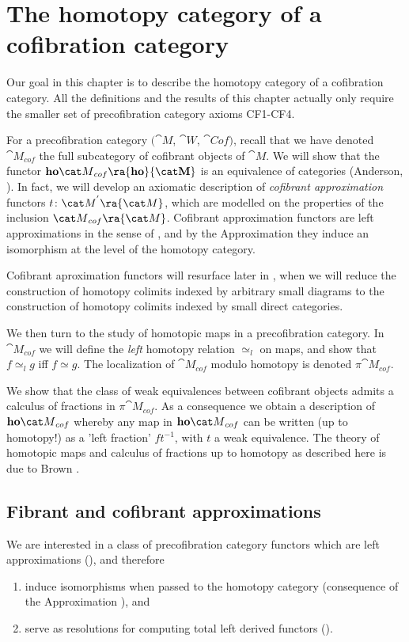 \chapter{The homotopy category of a cofibration category}
\label{chap:homotcat}

Our goal in this chapter is to describe the homotopy category of a cofibration category. All the definitions and the results of this chapter actually only require the smaller set of precofibration category axioms CF1-CF4. 

For a precofibration category $({\cat M}$, ${\cat W}$, ${\cat Cof})$, recall that we have denoted ${\cat M}_{cof}$ the full subcategory of cofibrant objects of ${\cat M}$. We will show that the functor ${\bf ho}{\cat M}_{cof} \ra {\bf ho} {\cat M}$ is an equivalence of categories (Anderson, \cite{Anderson1}). In fact, we will develop an axiomatic description of {\it cofibrant approximation} functors $t \colon {\cat M}^{'} \ra {\cat M}$, which are modelled on the properties of the inclusion ${\cat M}_{cof} \ra {\cat M}$. Cofibrant approximation functors are left approximations in the sense of , and by the Approximation  they induce an isomorphism at the level of the homotopy category. 

Cofibrant aproximation functors will resurface later in , when we will reduce the construction of homotopy colimits indexed by arbitrary small diagrams to the construction of homotopy colimits indexed by small direct categories.

We then turn to the study of homotopic maps in a precofibration category. In ${\cat M}_{cof}$ we will define the {\it left} homotopy relation $\simeq_l$ on maps, and show that $f \simeq_l g$ iff $f \simeq g$. The localization of ${\cat M}_{cof}$ modulo homotopy is denoted $\pi {\cat M}_{cof}$. 

We show that the class of weak equivalences between cofibrant objects admits a calculus of fractions in $\pi {\cat M}_{cof}$. As a consequence we obtain a description of ${\bf ho} {\cat M}_{cof}$ whereby any map in ${\bf ho} {\cat M}_{cof}$ can be written (up to homotopy!) as a 'left fraction' $f t^{-1}$, with $t$ a weak equivalence. The theory of homotopic maps and calculus of fractions up to homotopy as described here is due to Brown \cite{Brown}.

\section{Fibrant and cofibrant approximations}
\label{sec:cofapproximations}
We are interested in a class of precofibration category functors which are left approximations (), and therefore
\begin{enumerate}
\item
induce isomorphisms when passed to the homotopy category (consequence of the Approximation ), and 
\item
serve as resolutions for computing total left derived functors (). 
\end{enumerate}


